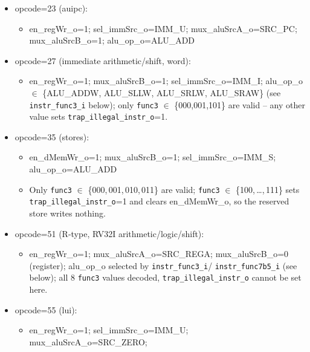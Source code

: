 \begin{itemize}
\begin{itemize}
\begin{itemize}
\begin{itemize}
          alu\_op\_o selected by \texttt{instr\_func3\_i}/\texttt{instr\_func7b5\_i}
          (see below); \texttt{trap\_illegal\_instr\_o} cannot be set here
          -- all 8 \texttt{func3} values are decoded.
      \end{itemize}
      \item opcode=23 (auipc):
      \begin{itemize}
        \item en\_regWr\_o=1; sel\_immSrc\_o=IMM\_U; mux\_aluSrcA\_o=SRC\_PC;
          mux\_aluSrcB\_o=1; alu\_op\_o=ALU\_ADD
      \end{itemize}
      \item opcode=27 (immediate arithmetic/shift, word):
      \begin{itemize}
        \item en\_regWr\_o=1; mux\_aluSrcB\_o=1; sel\_immSrc\_o=IMM\_I;
          alu\_op\_o $\in$ \{ALU\_ADDW, ALU\_SLLW, ALU\_SRLW, ALU\_SRAW\}
          (see \texttt{instr\_func3\_i} below); only \texttt{func3}
          $\in$ \{000,001,101\} are valid -- any other value sets
          \texttt{trap\_illegal\_instr\_o}=1.
      \end{itemize}
      \item opcode=35 (stores):
      \begin{itemize}
        \item en\_dMemWr\_o=1; mux\_aluSrcB\_o=1; sel\_immSrc\_o=IMM\_S;
          alu\_op\_o=ALU\_ADD
        \item Only \texttt{func3} $\in$ \{000,\,001,\,010,\,011\} are valid;
          \texttt{func3} $\in$ \{100,\,\ldots,\,111\} sets
          \texttt{trap\_illegal\_instr\_o}=1 and clears en\_dMemWr\_o, so the
          reserved store writes nothing.
      \end{itemize}
      \item opcode=51 (R-type, RV32I arithmetic/logic/shift):
      \begin{itemize}
        \item en\_regWr\_o=1; mux\_aluSrcA\_o=SRC\_REGA; mux\_aluSrcB\_o=0
          (register); alu\_op\_o selected by \texttt{instr\_func3\_i}/
          \texttt{instr\_func7b5\_i} (see below); all 8 \texttt{func3}
          values decoded, \texttt{trap\_illegal\_instr\_o} cannot be set here.
      \end{itemize}
      \item opcode=55 (lui):
      \begin{itemize}
        \item en\_regWr\_o=1; sel\_immSrc\_o=IMM\_U; mux\_aluSrcA\_o=SRC\_ZERO;

\end{itemize}
\end{itemize}
\end{itemize}
\end{itemize}
